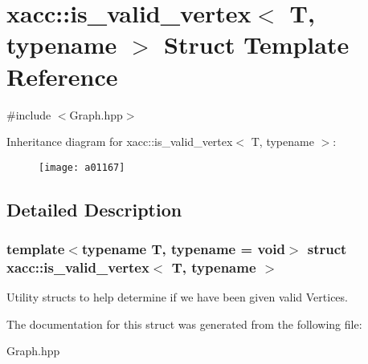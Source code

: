 \hypertarget{a01167}{}\section{xacc\+:\+:is\+\_\+valid\+\_\+vertex$<$ T, typename $>$ Struct Template Reference}
\label{a01167}


{\ttfamily \#include $<$Graph.\+hpp$>$}

Inheritance diagram for xacc\+:\+:is\+\_\+valid\+\_\+vertex$<$ T, typename $>$\+:\begin{figure}[H]
\begin{center}
\leavevmode
\texttt{[image: a01167]}
\end{center}
\end{figure}


\subsection{Detailed Description}
\subsubsection*{template$<$typename T, typename = void$>$\newline
struct xacc\+::is\+\_\+valid\+\_\+vertex$<$ T, typename $>$}

Utility structs to help determine if we have been given valid Vertices. 

The documentation for this struct was generated from the following file\+:\begin{DoxyCompactItemize}
\item 
Graph.\+hpp\end{DoxyCompactItemize}
